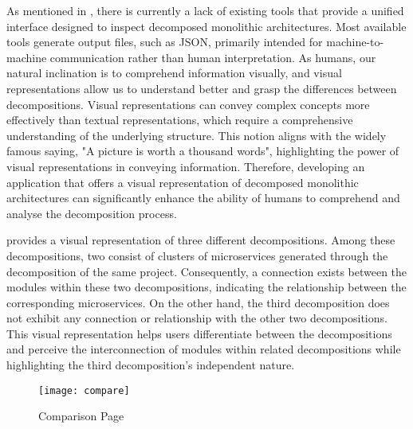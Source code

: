 As mentioned in , there is currently a lack of existing tools
that provide a unified interface designed to inspect decomposed monolithic
architectures. Most available tools generate output files, such as JSON,
primarily intended for machine-to-machine communication rather than human
interpretation. As humans, our natural inclination is to comprehend information
visually, and visual representations allow us to understand better and grasp
the differences between decompositions. Visual representations can convey
complex concepts more effectively than textual representations, which require a
comprehensive understanding of the underlying structure. This notion aligns
with the widely famous saying, "A picture is worth a thousand words",
highlighting the power of visual representations in conveying information.
Therefore, developing an application that offers a visual representation of
decomposed monolithic architectures can significantly enhance the ability of
humans to comprehend and analyse the decomposition process.

 provides a visual representation of three different
decompositions. Among these decompositions, two consist of clusters of
microservices generated through the decomposition of the same project.
Consequently, a connection exists between the modules within these two
decompositions, indicating the relationship between the corresponding
microservices. On the other hand, the third decomposition does not exhibit any
connection or relationship with the other two decompositions. This visual
representation helps users differentiate between the decompositions and
perceive the interconnection of modules within related decompositions while
highlighting the third decomposition's independent nature.

\begin{figure*}[!htb]
  \centering
  \texttt{[image: compare]}
  \caption{Comparison Page}
  \label{fig:comparison_page}
\end{figure*}
